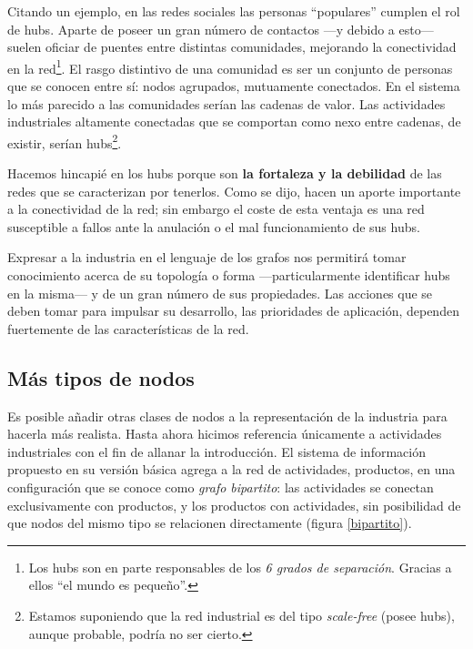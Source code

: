 \documentclass[a4paper]{report}
\begin{document}
Citando un ejemplo, en las redes sociales las personas ``populares'' cumplen el rol de hubs. Aparte de poseer un gran número de contactos —y debido a esto— suelen oficiar de puentes entre distintas comunidades, mejorando la conectividad en la red\footnote{Los hubs son en parte responsables de los \textit{6 grados de separación}. Gracias a ellos ``el mundo es pequeño''.}. El rasgo distintivo de una comunidad es ser un conjunto de personas que se conocen entre sí: nodos agrupados, mutuamente conectados. En el sistema lo más parecido a las comunidades serían las cadenas de valor. Las actividades industriales altamente conectadas que se comportan como nexo entre cadenas, de existir, serían hubs\footnote{Estamos suponiendo que la red industrial es del tipo \textit{scale-free} (posee hubs), aunque probable, podría no ser cierto.}.

Hacemos hincapié en los hubs porque son \textbf{la fortaleza y la debilidad} de las redes que se caracterizan por tenerlos. Como se dijo, hacen un aporte importante a la conectividad de la red; sin embargo el coste de esta ventaja es una red susceptible a fallos ante la anulación o el mal funcionamiento de sus hubs.

Expresar a la industria en el lenguaje de los grafos nos permitirá tomar conocimiento acerca de su topología o forma —particularmente identificar hubs en la misma— y de un gran número de sus propiedades. Las acciones que se deben tomar para impulsar su desarrollo, las prioridades de aplicación, dependen fuertemente de las características de la red.


\subsection*{Más tipos de nodos}

Es posible añadir otras clases de nodos a la representación de la industria para hacerla más realista. Hasta ahora hicimos referencia únicamente a actividades industriales con el fin de allanar la introducción. El sistema de información propuesto en su versión básica agrega a la red de actividades, productos, en una configuración que se conoce como \textit{grafo bipartito}: las actividades se conectan exclusivamente con productos, y los productos con actividades, sin posibilidad de que nodos del mismo tipo se relacionen directamente (figura \ref{bipartito}).
\end{document}
